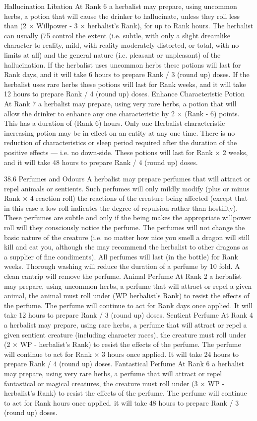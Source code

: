 \documentclass[a4paper]{article}
\begin{document}
\begin{multicols}{3}
Hallucination Libation
At Rank 6 a herbalist may prepare, using uncommon herbs, a potion that will cause the drinker to
hallucinate, unless they roll less than (2 × Willpower - 3 × herbalist’s Rank), for up to Rank
hours. The herbalist can usually (75%
control the extent (i.e. subtle, with only a slight
dreamlike character to reality, mild, with reality
moderately distorted, or total, with no limits at all)
and the general nature (i.e. pleasant or unpleasant)
of the hallucination. If the herbalist uses uncommon herbs these potions will last for Rank days,
and it will take 6 hours to prepare Rank / 3 (round
up) doses. If the herbalist uses rare herbs these
potions will last for Rank weeks, and it will take 12
hours to prepare Rank / 4 (round up) doses.
Enhance Characteristic Potion
At Rank 7 a herbalist may prepare, using very rare
herbs, a potion that will allow the drinker to enhance any one characteristic by 2 × (Rank - 6)
points. This has a duration of (Rank 6) hours. Only
one Herbalist characteristic increasing potion may
be in effect on an entity at any one time. There is
no reduction of characteristics or sleep period
required after the duration of the positive effects —
i.e. no down-side. These potions will last for Rank
× 2 weeks, and it will take 48 hours to prepare
Rank / 4 (round up) doses.

38.6 Perfumes and Odours
A herbalist may prepare perfumes that will attract
or repel animals or sentients. Such perfumes will
only mildly modify (plus or minus Rank × 4%
reaction roll) the reactions of the creature being
affected (except that in this case a low roll indicates the degree of repulsion rather than hostility).
These perfumes are subtle and only if the being
makes the appropriate willpower roll will they
consciously notice the perfume.
The perfumes will not change the basic nature of
the creature (i.e. no matter how nice you smell a
dragon will still kill and eat you, although she may
recommend the herbalist to other dragons as a
supplier of fine condiments). All perfumes will last
(in the bottle) for Rank weeks. Thorough washing
will reduce the duration of a perfume by 10 fold. A
clean cantrip will remove the perfume.
Animal Perfume
At Rank 2 a herbalist may prepare, using uncommon herbs, a perfume that will attract or repel a
given animal, the animal must roll under (WP herbalist’s Rank) to resist the effects of the perfume. The perfume will continue to act for Rank
days once applied. It will take 12 hours to prepare
Rank / 3 (round up) doses.
Sentient Perfume
At Rank 4 a herbalist may prepare, using rare
herbs, a perfume that will attract or repel a given
sentient creature (including character races), the
creature must roll under (2 × WP - herbalist’s
Rank) to resist the effects of the perfume. The
perfume will continue to act for Rank × 3 hours
once applied. It will take 24 hours to prepare Rank
/ 4 (round up) doses.
Fantastical Perfume
At Rank 6 a herbalist may prepare, using very rare
herbs, a perfume that will attract or repel fantastical or magical creatures, the creature must roll
under (3 × WP - herbalist’s Rank) to resist the
effects of the perfume. The perfume will continue
to act for Rank hours once applied. it will take 48
hours to prepare Rank / 3 (round up) doses.


\end{multicols}
\end{document}
